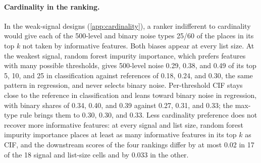 \paragraph{Cardinality in the ranking.}
In the weak-signal designs (\cref{app:cardinality}), a ranker indifferent to
cardinality would give each of the 500-level and binary noise types 25/60 of
the places in its top $k$ not taken by informative features. Both biases appear
at every list size. At the weakest signal, random forest impurity importance,
which prefers features with many possible thresholds, gives 500-level noise
0.29, 0.38, and 0.49 of its top 5, 10, and 25 in classification against
references of 0.18, 0.24, and 0.30, the same pattern in regression, and never
selects binary noise. Per-threshold CIF stays close to the reference in
classification and leans toward binary noise in regression, with binary shares
of 0.34, 0.40, and 0.39 against 0.27, 0.31, and 0.33; the max-type rule brings
them to 0.30, 0.30, and 0.33. Less cardinality preference does not recover more
informative features: at every signal and list size, random forest impurity
importance places at least as many informative features in its top $k$ as CIF,
and the downstream scores of the four rankings differ by at most 0.02 in 17 of
the 18 signal and list-size cells and by 0.033 in the other.
